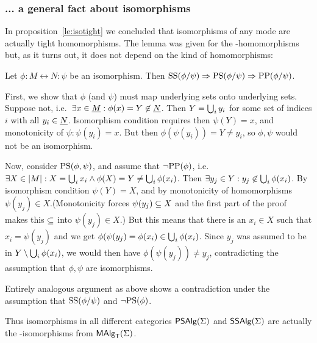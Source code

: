 \documentclass[10pt]{article}
\begin{document}
\subsubsection*{... a general fact about isomorphisms}
In proposition~\ref{le:isotight} we concluded that isomorphisms of any mode
are actually tight homomorphisms. The lemma was given for the 
\PP-homomorphisms but, as it turns out, it does not depend on the kind
of homomorphisms:

\begin{Prop}
\label{le:isopp}
Let $\phi:M\leftrightarrow N:\psi$ be an isomorphism. Then
${\rm SS}(\phi/\psi)\Rightarrow{\rm PS}(\phi/\psi)\Rightarrow{\rm PP}(\phi/\psi)$.
\end{Prop}

\begin{Proof}
First, we show that $\phi$ (and $\psi$) must map underlying sets onto
underlying sets.  Suppose not, i.e.\ $\exists x\in\underline {M} :
\phi(x)=Y\not\in\underline {N}$. Then $Y=\bigcup_i y_i$ for some set of
indices $i$ with all $y_i\in\underline {N}$. Isomorphism condition requires
then $\psi(Y)=x$, and monotonicity of $\psi: \psi(y_i)=x$. But then
$\phi(\psi(y_i))=Y\not=y_i$, so $\phi, \psi$ would not be an
isomorphism.

Now, consider ${\rm PS}(\phi,\psi)$, and assume that
$\neg{\rm PP}(\phi)$, i.e.\ $\exists X\in|M| : X=\bigcup_i x_i \land
\phi(X)=Y\not=\bigcup_i \phi(x_i)$. Then $\exists y_j\in
Y:y_j\not\in\bigcup_i \phi(x_i)$.  By isomorphism condition
$\psi(Y)=X$, and by monotonicity of homomorphisms $\psi(y_j)\in
X$.(Monotonicity forces $\psi(y_j)\subseteq X$ and the first part of the
proof makes this $\subseteq$ into $\psi(y_j)\in X$.) But this means that
there is an $x_i\in X$ such that $x_i=\psi(y_j)$ and we get
$\phi(\psi(y_j) = \phi(x_i) \in\bigcup_i \phi(x_i)$. Since $y_j$ was
assumed to be in $Y\setminus{\bigcup_i\phi(x_i)}$, we would then have
$\phi(\psi(y_j))\not= y_j$, contradicting the assumption that $\phi,
\psi$ are isomorphisms.

Entirely analogous argument as above shows a contradiction under the
assumption that ${\rm SS}(\phi/\psi)$ and $\neg{\rm PS}(\phi)$.
\end{Proof}


Thus isomorphisms in all different categories $\mbox{\sf PSAlg}(\Sigma)$ and $\mbox{\sf SSAlg}(\Sigma)$
are actually the \PP-isomorphisms from $\mbox{\rm\sf MAlg}_{\sf T}(\Sigma)$.
\end{document}
